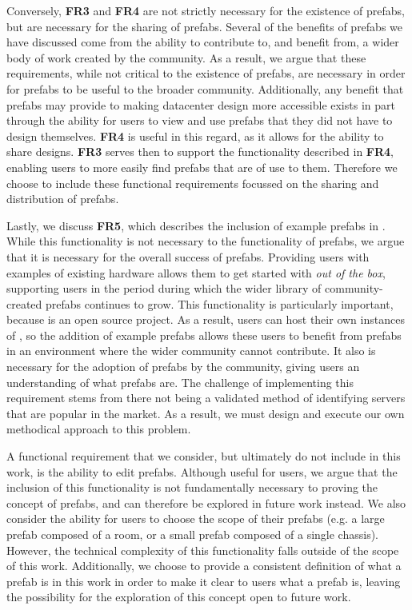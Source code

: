 \documentclass[11pt]{article}
\begin{document}
		Conversely, \textbf{FR3} and \textbf{FR4} are not strictly necessary for the existence of prefabs, but are necessary for the sharing of prefabs.
		Several of the benefits of prefabs we have discussed come from the ability to contribute to, and benefit from, a wider body of work created by the community.
		As a result, we argue that these requirements, while not critical to the existence of prefabs, are necessary in order for prefabs to be useful to the broader community.
		Additionally, any benefit that prefabs may provide to making datacenter design more accessible exists in part through the ability for users to view and use prefabs that they did not have to design themselves.
		\textbf{FR4} is useful in this regard, as it allows for the ability to share designs.
		\textbf{FR3} serves then to support the functionality described in \textbf{FR4}, enabling users to more easily find prefabs that are of use to them.
		Therefore we choose to include these functional requirements focussed on the sharing and distribution of prefabs.
		
		Lastly, we discuss \textbf{FR5}, which describes the inclusion of example prefabs in \opendc{}.
		While this functionality is not necessary to the functionality of prefabs, we argue that it is necessary for the overall success of prefabs.
		Providing users with examples of existing hardware allows them to get started with \opendc{} \textit{out of the box}, supporting users in the period during which the wider library of community-created prefabs continues to grow.
		This functionality is particularly important, because \opendc{} is an open source project. 
		As a result, users can host their own instances of \opendc{}, so the addition of example prefabs allows these users to benefit from prefabs in an environment where the wider community cannot contribute. 
		It also is necessary for the adoption of prefabs by the community, giving users an understanding of what prefabs are.
		The challenge of implementing this requirement stems from there not being a validated method of identifying servers that are popular in the market.
		As a result, we must design and execute our own methodical approach to this problem.

		A functional requirement that we consider, but ultimately do not include in this work, is the ability to edit prefabs.
		Although useful for users, we argue that the inclusion of this functionality is not fundamentally necessary to proving the concept of prefabs, and can therefore be explored in future work instead.
		We also consider the ability for users to choose the scope of their prefabs (e.g. a large prefab composed of a room, or a small prefab composed of a single chassis).
		However, the technical complexity of this functionality falls outside of the scope of this work.
		Additionally, we choose to provide a consistent definition of what a prefab is in this work in order to make it clear to users what a prefab is, leaving the possibility for the exploration of this concept open to future work.
\end{document}
